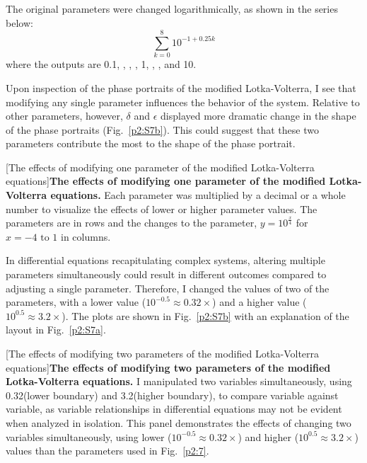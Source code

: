 The original parameters were changed logarithmically, as shown in the series below:
\begin{equation*}
\sum_{k=0}^{8} 10^{-1 + 0.25k}
\end{equation*}
where the outputs are 0.1, , , , 1, , ,  and 10.

Upon inspection of the phase portraits of the modified Lotka-Volterra, I see that modifying any single parameter influences the behavior of the system. Relative to other parameters, however, $\delta$ and $\epsilon$ displayed more dramatic change in the shape of the phase portraits (Fig.~\ref{p2:S7b}). This could suggest that these two parameters contribute the most to the shape of the phase portrait.


\begin{centering}
\captionsetup{parbox=none}
[The effects of modifying one parameter of the modified Lotka-Volterra equations]{\textbf{The effects of modifying one parameter of the modified Lotka-Volterra equations.} Each parameter was multiplied by a decimal or a whole number to visualize the effects of lower or higher parameter values. The parameters are in rows and the changes to the parameter, $y = 10^{\frac{x}{4}}$ for $x = -4 \text{ to } 1$ in columns.}
\label{p2:S7b}
\end{centering}

In differential equations recapitulating complex systems, altering multiple parameters simultaneously could result in different outcomes compared to adjusting a single parameter. Therefore, I changed the values of two of the parameters, with a lower value ($10^{-0.5} \approx 0.32\times$) and a higher value ($10^{0.5} \approx 3.2\times$). The plots are shown in Fig.~\ref{p2:S7b} with an explanation of the layout in Fig.~\ref{p2:S7a}.


\begin{centering}
\captionsetup{parbox=none}
[The effects of modifying two parameters of the modified Lotka-Volterra equations]{\textbf{The effects of modifying two parameters of the modified Lotka-Volterra equations.} I manipulated two variables simultaneously, using 0.32\times (lower boundary) and 3.2\times (higher boundary), to compare variable against variable, as variable relationships in differential equations may not be evident when analyzed in isolation. This panel demonstrates the effects of changing two variables simultaneously, using lower ($10^{-0.5} \approx 0.32\times$) and higher ($10^{0.5} \approx 3.2\times$) values than the parameters used in Fig.~\ref{p2:7}.}
\label{p2:S7c}
\end{centering}

